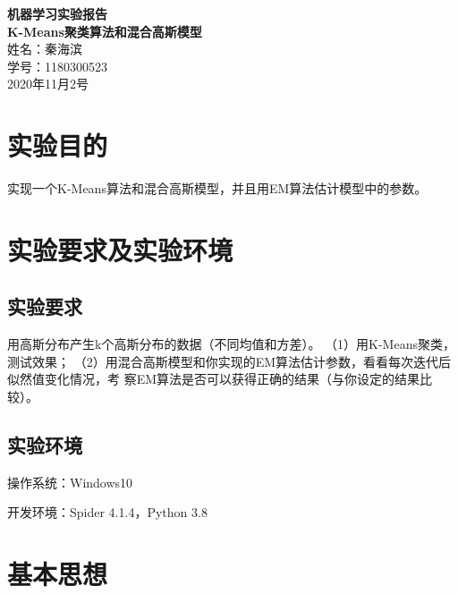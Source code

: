 \documentclass[12pt]{article}
\begin{document}
 
\begin{titlepage}
\begin{center}      
{\Huge \bfseries 机器学习实验报告}\\[1cm]
{\Large \bfseries K-Means聚类算法和混合高斯模型}\\[10cm]
{\Large 姓名：秦海滨}\\[1cm]
{\Large 学号：1180300523}\\[8cm]
{\Large 2020年11月2号}
\end{center}
\end{titlepage}
\newpage
\tableofcontents
\newpage
\section{实验目的}
实现一个K-Means算法和混合高斯模型，并且用EM算法估计模型中的参数。\par
\section{实验要求及实验环境}
\subsection{实验要求}
用高斯分布产生k个高斯分布的数据（不同均值和方差）。
（1）用K-Means聚类，测试效果；
（2）用混合高斯模型和你实现的EM算法估计参数，看看每次迭代后似然值变化情况，考
察EM算法是否可以获得正确的结果（与你设定的结果比较）。
\subsection{实验环境}
操作系统：Windows10\par
开发环境：Spider 4.1.4，Python 3.8\par
\section{基本思想}
\end{document}
